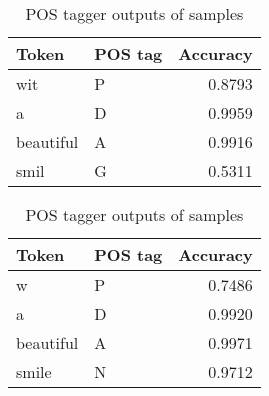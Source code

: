\begin{table}[!hbp]
\caption{POS tagger outputs of samples}
\label{tab:postags}
\begin{minipage}{.5\linewidth}
\begin{tabular}[h]{|llr|}
 \hline
Token & POS tag & Accuracy \\
 \hline
wit & P & 0.8793 \\
 \hline
a & D & 0.9959 \\
 \hline
beautiful & A & 0.9916 \\
 \hline
smil & G & 0.5311 \\
 \hline
\end{tabular}
\end{minipage}
\begin{minipage}{.5\linewidth}
\begin{tabular}[h]{|llr|}
 \hline
Token & POS tag & Accuracy \\
 \hline
w & P & 0.7486 \\
 \hline
a & D & 0.9920 \\
 \hline
beautiful & A & 0.9971 \\
 \hline
smile & N & 0.9712 \\
 \hline
\end{tabular}
\end{minipage}
\end{table}



